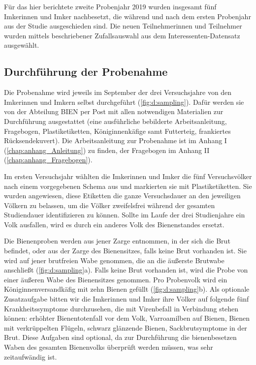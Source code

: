 Für das hier berichtete zweite Probenjahr 2019 wurden insgesamt fünf Imkerinnen und Imker nachbesetzt, die während und nach dem ersten Probenjahr aus der Studie ausgeschieden sind. Die neuen Teilnehmerinnen und Teilnehmer wurden mittels beschriebener Zufallsauswahl aus dem Interessenten-Datensatz ausgewählt.



\subsection{Durchführung der Probenahme} \label{chap:probenahme}

Die Probenahme wird jeweils im September der drei Versuchsjahre von den Imkerinnen und Imkern selbst durchgeführt (\cref{fig:d:sampling}). Dafür werden sie von der Abteilung BIEN per Post mit allen notwendigen Materialien zur Durchführung ausgestattet (eine ausführliche bebilderte Arbeitsanleitung, Fragebogen, Plastiketiketten, Königinnenkäfige samt Futterteig, frankiertes Rücksendekuvert). Die Arbeitsanleitung zur Probenahme ist im Anhang I (\cref{chap:anhang_Anleitung}) zu finden, der Fragebogen im Anhang II (\cref{chap:anhang_Fragebogen}).

Im ersten Versuchsjahr wählten die Imkerinnen und Imker die fünf Versuchsvölker nach einem vorgegebenen Schema aus und markierten sie mit Plastiketiketten. Sie wurden angewiesen, diese Etiketten die ganze Versuchsdauer an den jeweiligen Völkern zu belassen, um die Völker zweifelsfrei während der gesamten Studiendauer identifizieren zu können. Sollte im Laufe der drei Studienjahre ein Volk ausfallen, wird es durch ein anderes Volk des Bienenstandes ersetzt.

Die Bienenproben werden aus jener Zarge entnommen, in der sich die Brut befindet, oder aus der Zarge des Bienensitzes, falls keine Brut vorhanden ist. Sie wird auf jener brutfreien Wabe genommen, die an die äußerste Brutwabe anschließt (\cref{fig:d:sampling}a). Falls keine Brut vorhanden ist, wird die Probe von einer äußeren Wabe des Bienensitzes genommen. Pro Probenvolk wird ein Königinnenversandkäfig mit zehn Bienen gefüllt (\cref{fig:d:sampling}b). Als optionale Zusatzaufgabe bitten wir die Imkerinnen und Imker ihre Völker auf folgende fünf Krankheitssymptome durchzusehen, die mit Virenbefall in Verbindung stehen können: erhöhter Bienentotenfall vor dem Volk, Varroamilben auf Bienen, Bienen mit verkrüppelten Flügeln, schwarz glänzende Bienen, Sackbrutsymptome in der Brut. 
Diese Aufgaben sind optional, da zur Durchführung die bienenbesetzen Waben des gesamten Bienenvolks überprüft werden müssen, was sehr zeitaufwändig ist.


